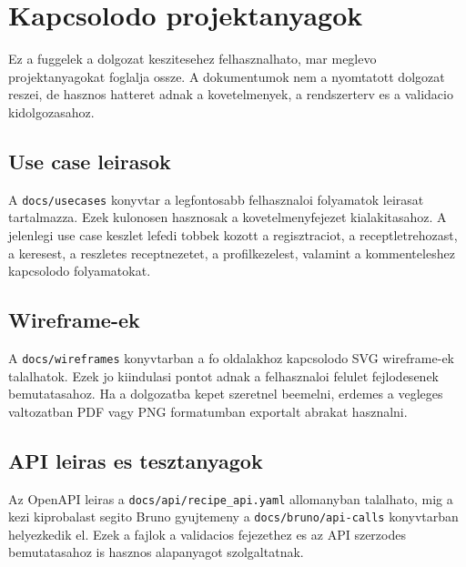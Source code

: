 ﻿\chapter{Kapcsolodo projektanyagok}
\label{app:project-assets}

Ez a fuggelek a dolgozat keszitesehez felhasznalhato, mar meglevo projektanyagokat foglalja ossze. A dokumentumok nem a nyomtatott dolgozat reszei, de hasznos hatteret adnak a kovetelmenyek, a rendszerterv es a validacio kidolgozasahoz.

\section{Use case leirasok}

A \texttt{docs/usecases} konyvtar a legfontosabb felhasznaloi folyamatok leirasat tartalmazza. Ezek kulonosen hasznosak a kovetelmenyfejezet kialakitasahoz. A jelenlegi use case keszlet lefedi tobbek kozott a regisztraciot, a receptletrehozast, a keresest, a reszletes receptnezetet, a profilkezelest, valamint a kommenteleshez kapcsolodo folyamatokat.

\section{Wireframe-ek}

A \texttt{docs/wireframes} konyvtarban a fo oldalakhoz kapcsolodo SVG wireframe-ek talalhatok. Ezek jo kiindulasi pontot adnak a felhasznaloi felulet fejlodesenek bemutatasahoz. Ha a dolgozatba kepet szeretnel beemelni, erdemes a vegleges valtozatban PDF vagy PNG formatumban exportalt abrakat hasznalni.

\section{API leiras es tesztanyagok}

Az OpenAPI leiras a \texttt{docs/api/recipe\_api.yaml} allomanyban talalhato, mig a kezi kiprobalast segito Bruno gyujtemeny a \texttt{docs/bruno/api-calls} konyvtarban helyezkedik el. Ezek a fajlok a validacios fejezethez es az API szerzodes bemutatasahoz is hasznos alapanyagot szolgaltatnak.


